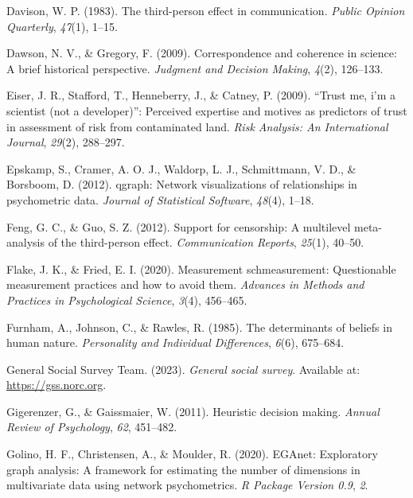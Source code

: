 \documentclass[
  ,jou,floatsintext]{apa6}
\newlength{\cslhangindent}
\newlength{\cslentryspacingunit} %
\newenvironment{CSLReferences}[2] %
 {%
  \setlength{\parindent}{0pt}
  \ifodd #1
  \let\oldpar\par
  \def\par{\hangindent=\cslhangindent\oldpar}
  \fi
  \setlength{\parskip}{#2\cslentryspacingunit}
 }%
 {}
\begin{document}
\begin{CSLReferences}{1}{0}
\leavevmode{}%
Davison, W. P. (1983). The third-person effect in communication. \emph{Public Opinion Quarterly}, \emph{47}(1), 1--15.

\leavevmode{}%
Dawson, N. V., \& Gregory, F. (2009). Correspondence and coherence in science: A brief historical perspective. \emph{Judgment and Decision Making}, \emph{4}(2), 126--133.

\leavevmode{}%
Eiser, J. R., Stafford, T., Henneberry, J., \& Catney, P. (2009). {``Trust me, i'm a scientist (not a developer)''}: Perceived expertise and motives as predictors of trust in assessment of risk from contaminated land. \emph{Risk Analysis: An International Journal}, \emph{29}(2), 288--297.

\leavevmode{}%
Epskamp, S., Cramer, A. O. J., Waldorp, L. J., Schmittmann, V. D., \& Borsboom, D. (2012). {qgraph}: Network visualizations of relationships in psychometric data. \emph{Journal of Statistical Software}, \emph{48}(4), 1--18.

\leavevmode{}%
Feng, G. C., \& Guo, S. Z. (2012). Support for censorship: A multilevel meta-analysis of the third-person effect. \emph{Communication Reports}, \emph{25}(1), 40--50.

\leavevmode{}%
Flake, J. K., \& Fried, E. I. (2020). Measurement schmeasurement: Questionable measurement practices and how to avoid them. \emph{Advances in Methods and Practices in Psychological Science}, \emph{3}(4), 456--465.

\leavevmode{}%
Furnham, A., Johnson, C., \& Rawles, R. (1985). The determinants of beliefs in human nature. \emph{Personality and Individual Differences}, \emph{6}(6), 675--684.

\leavevmode{}%
General Social Survey Team. (2023). \emph{General social survey}. Available at: \url{https://gss.norc.org}.

\leavevmode{}%
Gigerenzer, G., \& Gaissmaier, W. (2011). Heuristic decision making. \emph{Annual Review of Psychology}, \emph{62}, 451--482.

\leavevmode{}%
Golino, H. F., Christensen, A., \& Moulder, R. (2020). EGAnet: Exploratory graph analysis: A framework for estimating the number of dimensions in multivariate data using network psychometrics. \emph{R Package Version 0.9}, \emph{2}.


\end{CSLReferences}
\end{document}
